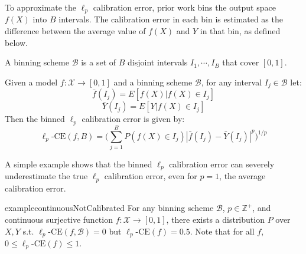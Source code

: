 To approximate the $\ell_p$ calibration error, prior work bins the output space $f(X)$ into $B$ intervals.
The calibration error in each bin is estimated as the difference between the average value of $f(X)$ and $Y$ in that bin, as defined below.

\begin{definition}
A binning scheme $\mathcal{B}$ is a set of $B$ disjoint intervals $I_1, \cdots, I_B$ that cover $[0, 1]$.
\end{definition}

\begin{definition}
Given a model $f : \mathcal{X} \to [0, 1]$ and a binning scheme $\mathcal{B}$, for any interval $I_j \in \mathcal{B}$ let:
\[ \bar{f}(I_j) = E[f(X) | f(X) \in I_j] \]
\[ \bar{Y}(I_j) = E[Y | f(X) \in I_j] \]
Then the binned $\ell_p$ calibration error is given by:
\[ \ell_p\mbox{-CE}(f, B) = \Big( \sum_{j=1}^B P(f(X) \in I_j) \left|\bar{f}(I_j) - \bar{Y}(I_j) \right|^p  \Big)^{1/p} \]
\end{definition}

A simple example shows that the binned $\ell_p$ calibration error can severely underestimate the true $\ell_p$ calibration error, even for $p=1$, the average calibration error.

\begin{restatable}{example}{continuousNotCalibrated}
\label{ex:continuous-not-calibrated}
For any binning scheme $\mathcal{B}$, $p \in \mathbb{Z}^+$, and continuous surjective function $f : \mathcal{X} \to [0, 1]$, there exists a distribution $P$ over $X, Y$ s.t. $\ell_p\mbox{-CE}(f, \mathcal{B}) = 0$ but $\ell_p\mbox{-CE}(f) = 0.5$.
Note that for all $f$, $0 \leq \ell_p\mbox{-CE}(f) \leq 1$.
\end{restatable}

